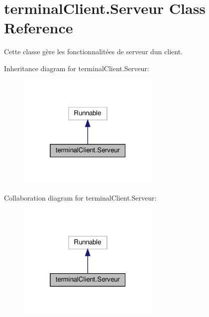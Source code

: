 \hypertarget{classterminalClient_1_1Serveur}{}\section{terminal\+Client.\+Serveur Class Reference}
\label{classterminalClient_1_1Serveur}


Cette classe gère les fonctionnalitées de serveur d\textquotesingle{}un client.  




Inheritance diagram for terminal\+Client.\+Serveur\+:\nopagebreak
\begin{figure}[H]
\begin{center}
\leavevmode
\includegraphics[width=193pt]{classterminalClient_1_1Serveur__inherit__graph}
\end{center}
\end{figure}


Collaboration diagram for terminal\+Client.\+Serveur\+:\nopagebreak
\begin{figure}[H]
\begin{center}
\leavevmode
\includegraphics[width=193pt]{classterminalClient_1_1Serveur__coll__graph}
\end{center}
\end{figure}
